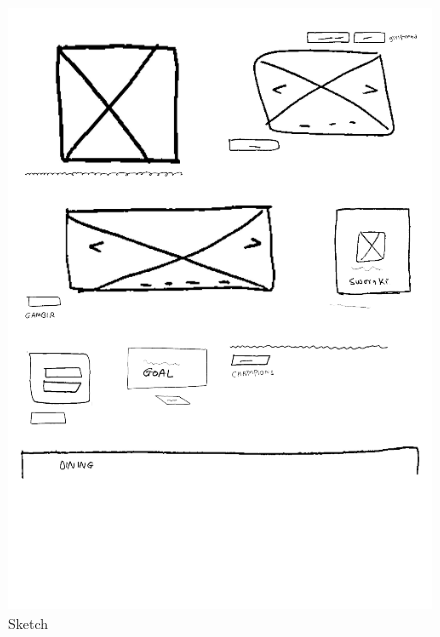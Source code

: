 \begin{figure}[H]
\begin{minipage}{0.35\textwidth}
        \includegraphics[width=\linewidth]{images/sample1-sketch.png}
        \caption{Sketch}
        \label{fig:s2}
    \end{minipage}
\end{figure}
\vspace{1em} 

